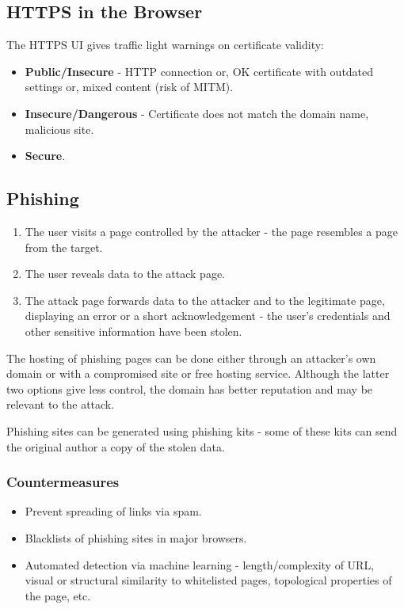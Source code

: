 \documentclass[11pt]{article}
\begin{document}
\subsection{HTTPS in the Browser}
The HTTPS UI gives traffic light warnings on certificate validity:
\begin{itemize}
  \item \textbf{Public/Insecure} - HTTP connection or, OK certificate with outdated settings or, mixed content (risk of MITM).
  \item \textbf{Insecure/Dangerous} - Certificate does not match the domain name, malicious site.
  \item \textbf{Secure}.
\end{itemize}

\subsection{Phishing}
\begin{enumerate}
  \item The user visits a page controlled by the attacker - the page resembles a page from the target.
  \item The user reveals data to the attack page.
  \item The attack page forwards data to the attacker and to the legitimate page, displaying an error or a short acknowledgement - the user's credentials and other sensitive information have been stolen.
\end{enumerate}
The hosting of phishing pages can be done either through an attacker's own domain or with a compromised site or free hosting service.
Although the latter two options give less control, the domain has better reputation and may be relevant to the attack.

Phishing sites can be generated using phishing kits - some of these kits can send the original author a copy of the stolen data.

\subsubsection{Countermeasures}
\begin{itemize}
  \item Prevent spreading of links via spam.
  \item Blacklists of phishing sites in major browsers.
  \item Automated detection via machine learning - length/complexity of URL, visual or structural similarity to whitelisted pages, topological properties of the page, etc.
\end{itemize}
\end{document}
